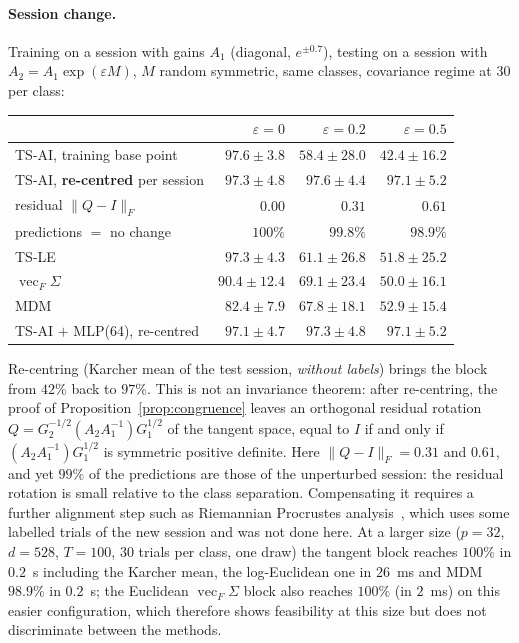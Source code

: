\documentclass[11pt,a4paper]{article}
\theoremstyle{plain}
\theoremstyle{definition}
\theoremstyle{remark}
\newcommand{\vecop}{\operatorname{vec}}
\begin{document}
\paragraph{Session change.} Training on a session with gains $A_1$
(diagonal, $e^{\pm0.7}$), testing on a session with $A_2=A_1\exp(\varepsilon M)$,
$M$ random symmetric, same classes, covariance regime at $30$ per class:
\begin{center}
\small
\begin{tabular}{lrrr}
\toprule
& $\varepsilon=0$ & $\varepsilon=0.2$ & $\varepsilon=0.5$ \\
\midrule
TS-AI, training base point & $97.6\pm3.8$ & $58.4\pm28.0$ & $42.4\pm16.2$ \\
TS-AI, \textbf{re-centred} per session & $97.3\pm4.8$ & $\mathbf{97.6}\pm4.4$ & $\mathbf{97.1}\pm5.2$ \\
\quad residual $\|Q-I\|_F$ & $0.00$ & $0.31$ & $0.61$ \\
\quad predictions $=$ no change & $100\%$ & $99.8\%$ & $98.9\%$ \\
TS-LE & $97.3\pm4.3$ & $61.1\pm26.8$ & $51.8\pm25.2$ \\
$\vecop_F\Sigma$ & $90.4\pm12.4$ & $69.1\pm23.4$ & $50.0\pm16.1$ \\
MDM & $82.4\pm7.9$ & $67.8\pm18.1$ & $52.9\pm15.4$ \\
TS-AI $+$ MLP(64), re-centred & $97.1\pm4.7$ & $97.3\pm4.8$ & $97.1\pm5.2$ \\
\bottomrule
\end{tabular}
\end{center}
Re-centring (Karcher mean of the test session, \emph{without labels}) brings
the block from $42\%$ back to $97\%$. This is not an invariance theorem:
after re-centring, the proof of Proposition~\ref{prop:congruence} leaves an
orthogonal residual rotation $Q=G_2^{-1/2}(A_2A_1^{-1})G_1^{1/2}$ of the
tangent space, equal to $I$ if and only if $(A_2A_1^{-1})G_1^{1/2}$ is
symmetric positive definite. Here $\|Q-I\|_F=0.31$ and $0.61$, and yet
$99\%$ of the predictions are those of the unperturbed session: the residual
rotation is small relative to the class separation. Compensating it
requires a further alignment step such as Riemannian Procrustes
analysis~\cite{rodrigues2019rpa}, which uses some labelled trials of the new
session and was not done here. At a larger size ($p=32$, $d=528$, $T=100$,
$30$ trials per class, one draw) the tangent block reaches $100\%$ in
$0.2$~s including the Karcher mean, the log-Euclidean one in $26$~ms and MDM
$98.9\%$ in $0.2$~s; the Euclidean $\vecop_F\Sigma$ block also reaches
$100\%$ (in $2$~ms) on this easier configuration, which therefore shows
feasibility at this size but does not discriminate between the methods.
\end{document}
